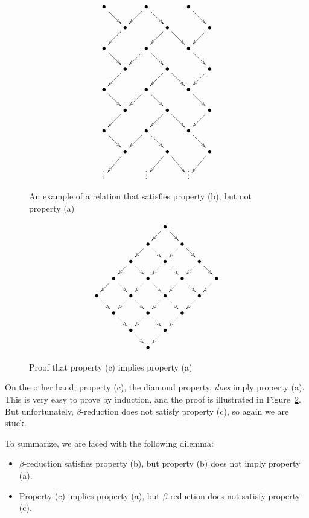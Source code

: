 \documentclass{article}
\begin{document}
\begin{figure}
\[ \xymatrix@-1em{
  \bullet\ar[dr]&&\bullet\ar[dl]\ar[dr]&&\bullet\ar[dr] \\
  &\bullet\ar[dl]&&\bullet\ar[dl]\ar[dr]&&\bullet\ar[dl] \\
  \bullet\ar[dr]&&\bullet\ar[dl]\ar[dr]&&\bullet\ar[dr] \\
  &\bullet\ar[dl]&&\bullet\ar[dl]\ar[dr]&&\bullet\ar[dl] \\
  \bullet\ar[dr]&&\bullet\ar[dl]\ar[dr]&&\bullet\ar[dr] \\
  &\bullet\ar[dl]&&\bullet\ar[dl]\ar[dr]&&\bullet\ar[dl] \\
  \bullet\ar[dr]&&\bullet\ar[dl]\ar[dr]&&\bullet\ar[dr] \\
  &\bullet\ar[dl]&&\bullet\ar[dl]\ar[dr]&&\bullet\ar[dl] \\
  \vdots &&   \vdots &&   \vdots & 
  }
\]
\caption{An example of a relation that satisfies property (b), but not
  property (a)}
\label{fig-b-not-a}
\end{figure}

\begin{figure}
\[ \xymatrix@-1em@dr{
  \bullet\ar[r]\ar[d] & \bullet\ar[r]\ar@{.>}[d] & \bullet\ar[r]\ar@{.>}[d] &
  \bullet\ar@{.>}[d] \\
  \bullet\ar@{.>}[r]\ar[d] & \bullet\ar@{.>}[r]\ar@{.>}[d] & \bullet\ar@{.>}[r]\ar@{.>}[d] &
  \bullet\ar@{.>}[d] \\
  \bullet\ar@{.>}[r]\ar[d] & \bullet\ar@{.>}[r]\ar@{.>}[d] & \bullet\ar@{.>}[r]\ar@{.>}[d] &
  \bullet\ar@{.>}[d] \\
  \bullet\ar@{.>}[r]\ar[d] & \bullet\ar@{.>}[r]\ar@{.>}[d] & \bullet\ar@{.>}[r]\ar@{.>}[d] &
  \bullet\ar@{.>}[d] \\
  \bullet\ar@{.>}[r] & \bullet\ar@{.>}[r] & \bullet\ar@{.>}[r] &
  \bullet 
  }
\]
\caption{Proof that property (c) implies property (a)}
\label{fig-diamond-a}
\end{figure}

On the other hand, property (c), the diamond property, {\em does}
imply property (a). This is very easy to prove by induction, and the
proof is illustrated in Figure~\ref{fig-diamond-a}. But unfortunately,
$\beta$-reduction does not satisfy property (c), so again we are stuck.

To summarize, we are faced with the following dilemma:
\begin{itemize}
\item $\beta$-reduction satisfies property (b), but property (b) does
  not imply property (a).
\item Property (c) implies property (a), but $\beta$-reduction does
  not satisfy property (c).
\end{itemize}
\end{document}
